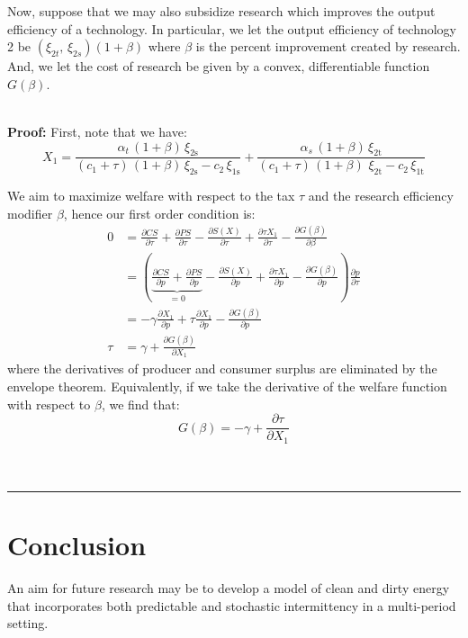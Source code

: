 \documentclass[11pt,a4paper]{extarticle}
\newenvironment{proof}[1][Proof]{\noindent\textbf{#1:} }{\ \rule{0.5em}{0.5em}}
\begin{document}
Now, suppose that we may also subsidize research which improves the output efficiency of a technology. In particular, we let the output efficiency of technology 2 be $(\xi_{2t}, \, \xi_{2s})(1 + \beta)$ where $\beta$ is the percent improvement created by research. And, we let the cost of research be given by a convex, differentiable function $G(\beta)$. 


\hfill \\
\begin{proof} First, note that we have:
	$$X_1 = \dfrac{\alpha _{t}\,(1+\beta) \, \xi_{\mathrm{2s}}}{(c_{1}+ \tau)\,(1+\beta)\,\xi _{\mathrm{2s}}-c_{2}\,\xi _{\mathrm{1s}}}+\dfrac{\alpha _{s}\,(1+\beta)\,\xi _{\mathrm{2t}}}{(c_{1}+ \tau)\,(1+\beta)\,\,\xi _{\mathrm{2t}}-c_{2}\,\xi _{\mathrm{1t}}}$$		
	
	We aim to maximize welfare with respect to the tax $\tau$ and the research efficiency modifier $\beta$, hence our first order condition is:
	\begin{align*}
	0 	 &= \frac{\partial CS}{\partial \tau} + \frac{\partial PS}{\partial \tau} - \frac{\partial S(X)}{\partial \tau} + \frac{\partial \tau X_1}{\partial \tau}  - \frac{\partial G(\beta)}{\partial \beta}\\
	&=  \left( \underbrace{\frac{\partial CS}{\partial p}  + \frac{\partial PS}{\partial p}}_{= 0} - \frac{ \partial  S(X)}{\partial p} + \frac{\partial \tau X_1}{\partial p} - \frac{\partial G(\beta)}{\partial p} \right) \frac{\partial p}{\partial \tau} \\
	&=  - \gamma \frac{\partial  X_1}{\partial p} + \tau \frac{\partial  X_1}{\partial p} - \frac{\partial G(\beta)}{\partial p} \\
	\tau &= \gamma + \frac{\partial G(\beta)}{\partial X_1}
	\end{align*}
	where the derivatives of producer and consumer surplus are eliminated by the envelope theorem. Equivalently, if we take the derivative of the welfare function with respect to $\beta$, we find that:
	$$G(\beta) = -\gamma + \frac{\partial \tau}{\partial X_1}$$
	\\ \hfill
\end{proof}

\pagebreak

\section{Conclusion}

An aim for future research may be to develop a model of clean and dirty energy that incorporates both predictable and stochastic intermittency in a multi-period setting. 
\end{document}
